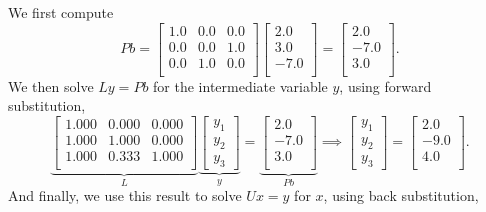 We first compute 
$$P b = \left[
\begin{array}{ccc}
1.0 & 0.0 & 0.0 \\
0.0 & 0.0 & 1.0 \\
0.0 & 1.0 & 0.0 \\
\end{array}
\right] \left[
\begin{array}{r}
2.0 \\
3.0 \\
-7.0 \\
\end{array}
\right] = \left[
\begin{array}{r}
2.0 \\
-7.0 \\
3.0 \\
\end{array}
\right]. $$
We then solve $L y = P b$ for the intermediate variable $y$, using forward substitution, 
$$\underbrace{\left[ \begin{array}{ccc}
1.000 & 0.000 & 0.000 \\
1.000 & 1.000 & 0.000 \\
1.000 & 0.333 & 1.000 \\
\end{array}
\right]}_{L} \underbrace{\begin{bmatrix}y_1 \\y_2 \\ y_3 \end{bmatrix}}_{y} =\underbrace{ \left[
\begin{array}{r}
2.0 \\
-7.0 \\
3.0 \\
\end{array}
\right]}_{P b} \implies\begin{bmatrix}y_1 \\y_2 \\ y_3 \end{bmatrix} = \left[
\begin{array}{r}
2.0 \\
-9.0 \\
4.0 \\
\end{array}
\right]. $$
And finally, we use this result to solve $U x = y$ for $x$, using back substitution,
